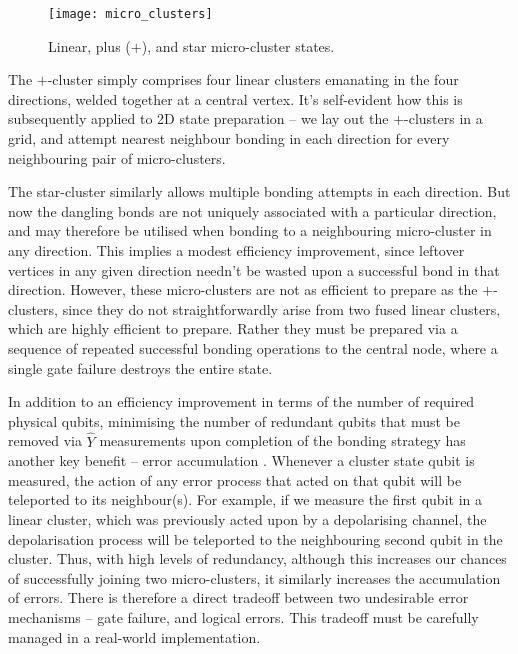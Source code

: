 \begin{figure}[!htb]
\texttt{[image: micro\_clusters]}
\caption{Linear, plus ($+$), and star micro-cluster states.}\label{fig:micro_clusters}
\end{figure}

The $+$-cluster simply comprises four linear clusters emanating in the four directions, welded together at a central vertex. It's self-evident how this is subsequently applied to 2D state preparation -- we lay out the $+$-clusters in a grid, and attempt nearest neighbour bonding in each direction for every neighbouring pair of micro-clusters.

The star-cluster similarly allows multiple bonding attempts in each direction. But now the dangling bonds are not uniquely associated with a particular direction, and may therefore be utilised when bonding to a neighbouring micro-cluster in any direction. This implies a modest efficiency improvement, since leftover vertices in any given direction needn't be wasted upon a successful bond in that direction. However, these micro-clusters are not as efficient to prepare as the $+$-clusters, since they do not straightforwardly arise from two fused linear clusters, which are highly efficient to prepare. Rather they must be prepared via a sequence of repeated successful bonding operations to the central node, where a single gate failure destroys the entire state.

In addition to an efficiency improvement in terms of the number of required physical qubits, minimising the number of redundant qubits that must be removed via $\hat{Y}$ measurements upon completion of the bonding strategy has another key benefit -- error accumulation \cite{RohdeMunroEtal}. Whenever a cluster state qubit is measured, the action of any error process that acted on that qubit will be teleported to its neighbour(s). For example, if we measure the first qubit in a linear cluster, which was previously acted upon by a depolarising channel, the depolarisation process will be teleported to the neighbouring second qubit in the cluster. Thus, with high levels of redundancy, although this increases our chances of successfully joining two micro-clusters, it similarly increases the accumulation of errors. There is therefore a direct tradeoff between two undesirable error mechanisms -- gate failure, and logical errors. This tradeoff must be carefully managed in a real-world implementation.

